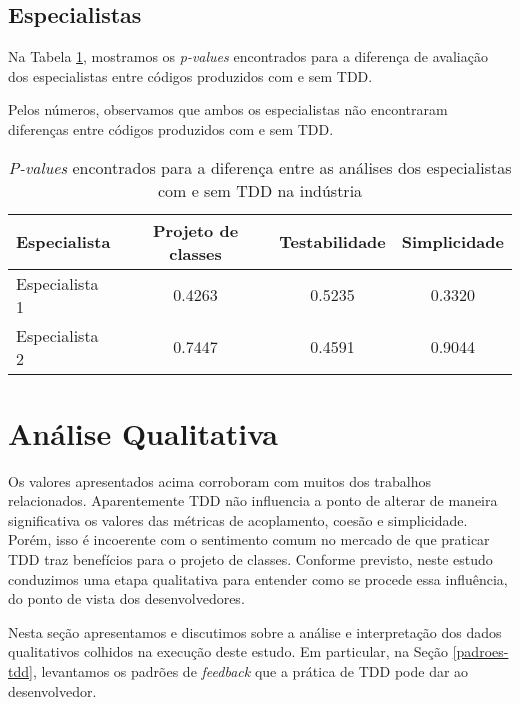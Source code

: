 \documentclass[conference]{IEEEtran}
\begin{document}
\subsection{Especialistas}

Na Tabela
\ref{tab:especialistas-industria},
mostramos os \textit{p-values} encontrados para a diferença de avaliação dos especialistas
entre códigos produzidos com e sem TDD.

Pelos números, observamos que ambos os especialistas não encontraram diferenças 
entre códigos produzidos com e sem TDD. 

\begin{table}[h!]
	\centering
	\begin{tabular}{| p{2cm} | c | c | c | }
		\hline
		Especialista & Projeto de classes & Testabilidade & Simplicidade\\
		\hline
		Especialista 1 &	0.4263 &	0.5235 &	0.3320\\
		Especialista 2 &	0.7447 &	0.4591 &	0.9044\\
		\hline
	\end{tabular}
	\caption{\textit{P-values} encontrados para a diferença entre as análises dos especialistas com e sem TDD na indústria}
	\label{tab:especialistas-industria}
\end{table}

\section{Análise Qualitativa}

Os valores apresentados acima corroboram com muitos dos trabalhos relacionados. 
Aparentemente TDD não influencia a ponto de alterar 
de maneira significativa os valores das métricas de acoplamento, coesão e simplicidade.
Porém, isso é incoerente com o sentimento comum no mercado de que praticar TDD
traz benefícios para o projeto de classes. Conforme previsto, neste estudo conduzimos
uma etapa qualitativa para entender como se procede essa influência, do ponto
de vista dos desenvolvedores.

Nesta seção apresentamos e discutimos sobre a análise e interpretação dos dados qualitativos colhidos
na execução deste estudo. Em particular, na Seção 
\ref{padroes-tdd}, levantamos os padrões de \textit{feedback} que a prática de TDD
pode dar ao desenvolvedor.
\end{document}

